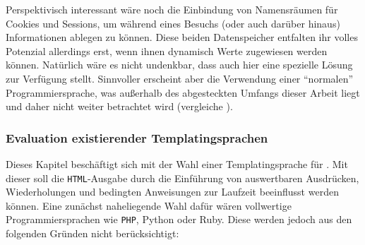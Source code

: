Perspektivisch interessant wäre noch die Einbindung von Namensräumen für Cookies und Sessions, um während eines Besuchs (oder auch darüber hinaus) Informationen ablegen zu können. Diese beiden Datenspeicher entfalten ihr volles Potenzial allerdings erst, wenn ihnen dynamisch Werte zugewiesen werden können. Natürlich wäre es nicht undenkbar, dass \idename{} auch hier eine spezielle Lösung zur Verfügung stellt. Sinnvoller erscheint aber die Verwendung einer "`normalen"' Programmiersprache, was außerhalb des abgesteckten Umfangs dieser Arbeit liegt und daher nicht weiter betrachtet wird (vergleiche ).

\subsubsection{Evaluation existierender Templatingsprachen}
\label{sec:eval-templating-language}

Dieses Kapitel beschäftigt sich mit der Wahl einer Templatingsprache für \idename{}. Mit dieser soll die \texttt{HTML}-Ausgabe durch die Einführung von auswertbaren Ausdrücken, Wiederholungen und bedingten Anweisungen zur Laufzeit beeinflusst werden können. Eine zunächst naheliegende Wahl dafür wären vollwertige Programmiersprachen wie \texttt{PHP}, Python oder Ruby. Diese werden jedoch aus den folgenden Gründen nicht berücksichtigt:


